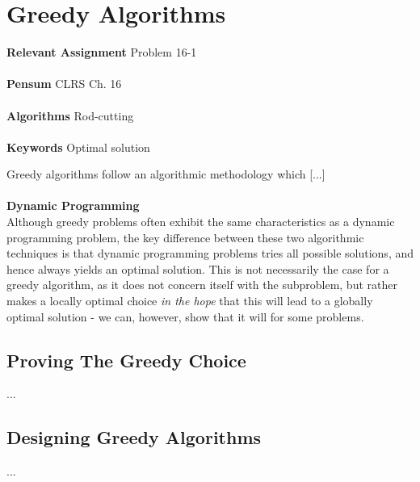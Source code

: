 
\chapter{Greedy Algorithms}
\label{ch:greedyalgorithms}

\textbf{Relevant Assignment} Problem 16-1 \\\\
\textbf{Pensum} CLRS Ch. 16\\\\
\textbf{Algorithms} Rod-cutting \\\\
\textbf{Keywords} Optimal solution
\vspace{1in}

\noindent Greedy algorithms follow an algorithmic methodology which [...] 
\\\\
\noindent \textbf{Dynamic Programming} \\
Although greedy problems often exhibit the same characteristics as a dynamic
programming problem, the key difference between these two algorithmic
techniques is that dynamic programming problems tries all possible solutions,
and hence always yields an optimal solution. This is not necessarily the case
for a greedy algorithm, as it does not concern itself with the subproblem, but
rather makes a locally optimal choice \textit{in the hope} that this will lead
to a globally optimal solution - we can, however, show that it will for some
problems.

\section{Proving The Greedy Choice}
...

\section{Designing Greedy Algorithms}
...
